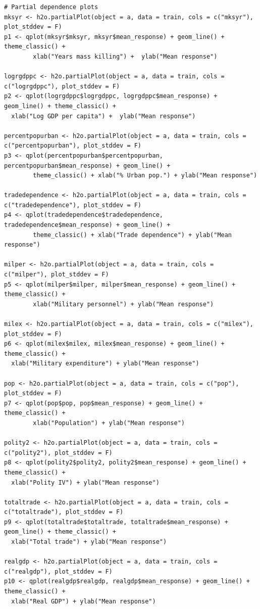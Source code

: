 \begin{verbatim}
# Partial dependence plots
mksyr <- h2o.partialPlot(object = a, data = train, cols = c("mksyr"), plot_stddev = F)
p1 <- qplot(mksyr$mksyr, mksyr$mean_response) + geom_line() + theme_classic() +
        xlab("Years mass killing") +  ylab("Mean response")

logrgdppc <- h2o.partialPlot(object = a, data = train, cols = c("logrgdppc"), plot_stddev = F)
p2 <- qplot(logrgdppc$logrgdppc, logrgdppc$mean_response) + geom_line() + theme_classic() +
  xlab("Log GDP per capita") +  ylab("Mean response")

percentpopurban <- h2o.partialPlot(object = a, data = train, cols = c("percentpopurban"), plot_stddev = F)
p3 <- qplot(percentpopurban$percentpopurban, percentpopurban$mean_response) + geom_line() +
        theme_classic() + xlab("% Urban pop.") + ylab("Mean response")

tradedependence <- h2o.partialPlot(object = a, data = train, cols = c("tradedependence"), plot_stddev = F)
p4 <- qplot(tradedependence$tradedependence, tradedependence$mean_response) + geom_line() +
        theme_classic() + xlab("Trade dependence") + ylab("Mean response")

milper <- h2o.partialPlot(object = a, data = train, cols = c("milper"), plot_stddev = F)
p5 <- qplot(milper$milper, milper$mean_response) + geom_line() + theme_classic() +
        xlab("Military personnel") + ylab("Mean response")

milex <- h2o.partialPlot(object = a, data = train, cols = c("milex"), plot_stddev = F)
p6 <- qplot(milex$milex, milex$mean_response) + geom_line() + theme_classic() +
  xlab("Military expenditure") + ylab("Mean response")

pop <- h2o.partialPlot(object = a, data = train, cols = c("pop"), plot_stddev = F)
p7 <- qplot(pop$pop, pop$mean_response) + geom_line() + theme_classic() +
        xlab("Population") + ylab("Mean response")

polity2 <- h2o.partialPlot(object = a, data = train, cols = c("polity2"), plot_stddev = F)
p8 <- qplot(polity2$polity2, polity2$mean_response) + geom_line() + theme_classic() +
  xlab("Polity IV") + ylab("Mean response")

totaltrade <- h2o.partialPlot(object = a, data = train, cols = c("totaltrade"), plot_stddev = F)
p9 <- qplot(totaltrade$totaltrade, totaltrade$mean_response) + geom_line() + theme_classic() +
  xlab("Total trade") + ylab("Mean response")

realgdp <- h2o.partialPlot(object = a, data = train, cols = c("realgdp"), plot_stddev = F)
p10 <- qplot(realgdp$realgdp, realgdp$mean_response) + geom_line() + theme_classic() +
  xlab("Real GDP") + ylab("Mean response")


\end{verbatim}
